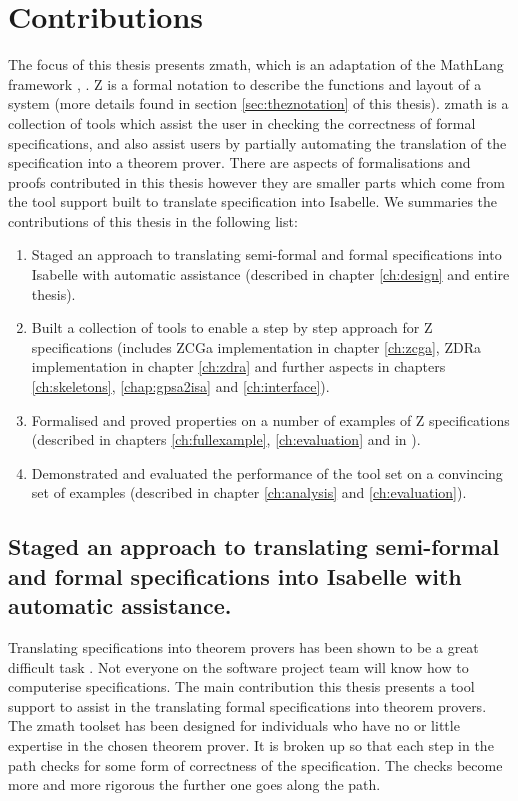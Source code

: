 \section{Contributions}

The focus of this thesis presents \gls{zmath}, which is an adaptation of the
MathLang framework \cite{newmathlang}, \cite{wtt}. Z is a formal notation to
describe the functions and layout of a system (more details found in section
\ref{sec:theznotation} of this thesis). \Gls{zmath} is a collection of tools
which assist the user in checking the correctness of formal specifications, and
also assist users by partially automating the translation of the specification
into a theorem prover. There are aspects of formalisations and proofs
contributed in this thesis however they are smaller parts which come from the
tool support built to translate specification into Isabelle. We summaries the
contributions of this thesis in the following list:

\begin{enumerate}
\item Staged an approach to translating semi-formal and formal specifications
into Isabelle with automatic assistance (described in chapter \ref{ch:design}
and entire thesis).
\item Built a collection of tools to enable a step by step approach for Z
specifications (includes ZCGa implementation in chapter \ref{ch:zcga}, ZDRa implementation in
chapter \ref{ch:zdra} and further aspects in chapters \ref{ch:skeletons},
\ref{chap:gpsa2isa} and \ref{ch:interface}).
\item Formalised and proved properties on a number of examples of Z
specifications (described in chapters \ref{ch:fullexample}, \ref{ch:evaluation}
and in \cite{mathlangexamples}).
\item Demonstrated and evaluated the performance of the tool set on a convincing
set of examples (described in chapter \ref{ch:analysis} and \ref{ch:evaluation}).
\end{enumerate}

\subsection{Staged an approach to translating semi-formal and formal specifications into Isabelle with automatic assistance.}

Translating specifications into theorem provers has been shown to be a great
difficult task \cite{johnharrisonslides}. Not everyone on the software project
team will know how to computerise specifications. The main contribution this
thesis presents a tool support to assist in the translating formal
specifications into theorem provers. The \gls{zmath} toolset has been designed
for individuals who have no or little expertise in the chosen theorem prover. It
is broken up so that each step in the path checks for some form of correctness
of the specification. The checks become more and more rigorous the further one
goes along the path.

